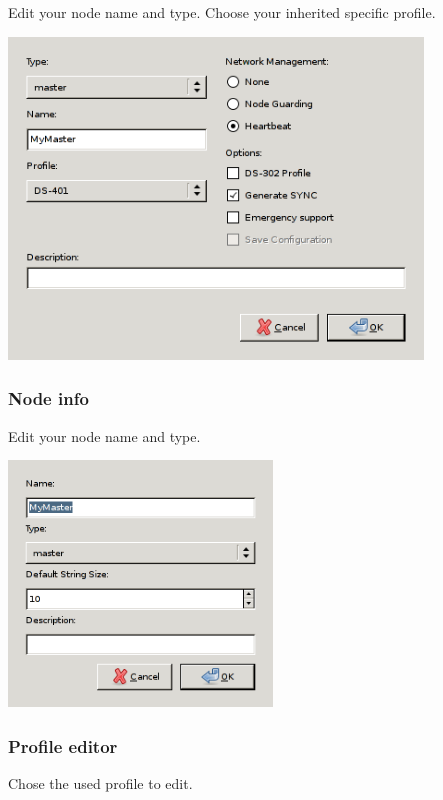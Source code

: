 \documentclass[12pt,english,a4paper]{book}
\begin{document}
Edit your node name and type. Choose your inherited specific profile.

\begin{center}
\includegraphics[width=11cm]{Pictures/new_node} 
\par\end{center}


\subsubsection{Node info}

Edit your node name and type.

\begin{center}
\includegraphics[width=7cm]{Pictures/node_info} 
\par\end{center}


\subsubsection{Profile editor}

Chose the used profile to edit.
\end{document}
